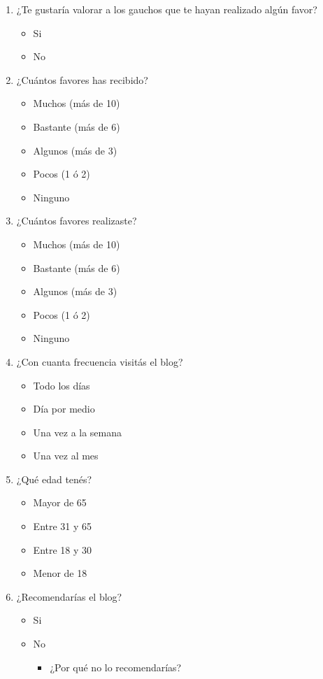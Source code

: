 \documentclass[a4paper,10pt]{article}
\begin{document}
\begin{enumerate}
    \item ¿Te gustaría valorar a los gauchos que te hayan realizado algún favor?
    \begin{itemize}
        \item Si
        \item No
    \end{itemize}

    \item ¿Cuántos favores has recibido?
    \begin{itemize}
        \item Muchos (más de 10)
        \item Bastante (más de 6)
        \item Algunos (más de 3)
        \item Pocos (1 ó 2)
        \item Ninguno
    \end{itemize}

    \item ¿Cuántos favores realizaste?
    \begin{itemize}
        \item Muchos (más de 10)
        \item Bastante (más de 6)
        \item Algunos (más de 3)
        \item Pocos (1 ó 2)
        \item Ninguno
    \end{itemize}

    \item ¿Con cuanta frecuencia visitás el blog?
    \begin{itemize}
        \item Todo los días
        \item Día por medio
        \item Una vez a la semana
        \item Una vez al mes
    \end{itemize}

    \item ¿Qué edad tenés?
    \begin{itemize}
        \item Mayor de 65
        \item Entre 31 y 65
        \item Entre 18 y 30
        \item Menor de 18
    \end{itemize}

    \item ¿Recomendarías el blog?
    \begin{itemize}
        \item Si
        \item No
        \begin{itemize}
            \item ¿Por qué no lo recomendarías?


\end{itemize}
\end{itemize}
\end{enumerate}
\end{document}
